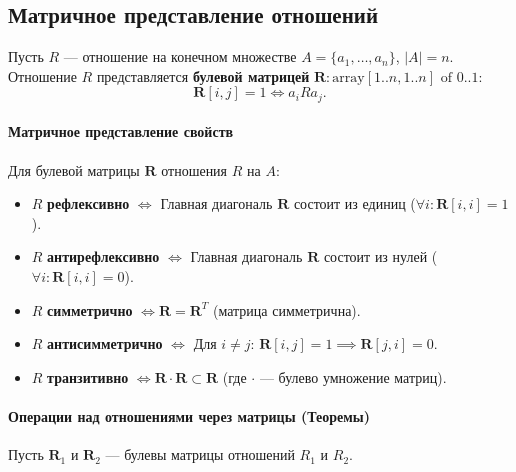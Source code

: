 \subsection*{Матричное представление отношений}

Пусть $R$ --- отношение на конечном множестве $A = \{a_1, \ldots, a_n\}$, $|A|=n$. Отношение $R$ представляется \textbf{булевой матрицей} $\mathbf{R}: \text{array} [1..n, 1..n] \text{ of } 0..1$:
$$\mathbf{R}[i, j] = 1 \iff a_i R a_j.$$

\paragraph{Матричное представление свойств}
Для булевой матрицы $\mathbf{R}$ отношения $R$ на $A$:
\begin{itemize}
    \item $R$ \textbf{рефлексивно} $\iff$ Главная диагональ $\mathbf{R}$ состоит из единиц ($\forall i: \mathbf{R}[i, i] = 1$).
    \item $R$ \textbf{антирефлексивно} $\iff$ Главная диагональ $\mathbf{R}$ состоит из нулей ($\forall i: \mathbf{R}[i, i] = 0$).
    \item $R$ \textbf{симметрично} $\iff \mathbf{R} = \mathbf{R}^T$ (матрица симметрична).
    \item $R$ \textbf{антисимметрично} $\iff$ Для $i \ne j$: $\mathbf{R}[i, j] = 1 \implies \mathbf{R}[j, i] = 0$.
    \item $R$ \textbf{транзитивно} $\iff \mathbf{R} \cdot \mathbf{R} \subset \mathbf{R}$ (где $\cdot$ --- булево умножение матриц).
\end{itemize}

\paragraph{Операции над отношениями через матрицы (Теоремы)}
Пусть $\mathbf{R}_1$ и $\mathbf{R}_2$ --- булевы матрицы отношений $R_1$ и $R_2$.

